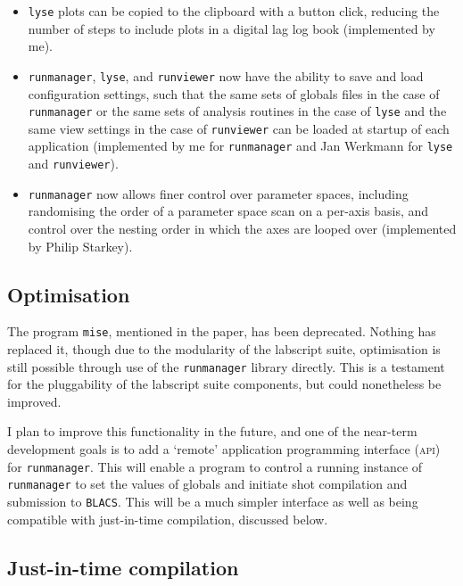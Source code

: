 \begin{itemize}
    \item \texttt{lyse} plots can be copied to the clipboard with a button click, reducing the number of steps to include plots in a digital lag log book (implemented by me).
    
    \item \texttt{runmanager}, \texttt{lyse}, and \texttt{runviewer} now have the ability to save and load configuration settings, such that the same sets of globals files in the case of \texttt{runmanager} or the same sets of analysis routines in the case of \texttt{lyse} and the same view settings in the case of \texttt{runviewer} can be loaded at startup of each application (implemented by me for \texttt{runmanager} and Jan Werkmann for \texttt{lyse} and \texttt{runviewer}).
    
    \item \texttt{runmanager} now allows finer control over parameter spaces, including randomising the order of a parameter space scan on a per-axis basis, and control over the nesting order in which the axes are looped over (implemented by Philip Starkey).
\end{itemize}

\subsection{Optimisation}

The program \texttt{mise}, mentioned in the paper, has been deprecated. Nothing has replaced it, though due to the modularity of the labscript suite, optimisation is still possible through use of the \texttt{runmanager} library directly. This is a testament for the pluggability of the labscript suite components, but could nonetheless be improved.

I plan to improve this functionality in the future, and one of the near-term development goals is to add a `remote' application programming interface (\textsc{api}) for \texttt{runmanager}. This will enable a program to control a running instance of \texttt{runmanager} to set the values of globals and initiate shot compilation and submission to \texttt{BLACS}. This will be a much simpler interface as well as being compatible with just-in-time compilation, discussed below.

\subsection{Just-in-time compilation}

